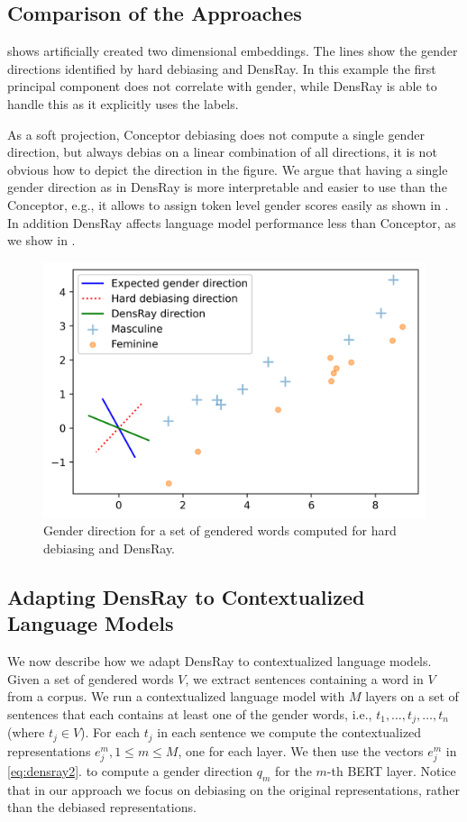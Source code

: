 \subsection{Comparison of the Approaches}
  shows artificially created two dimensional embeddings. The lines show the gender directions identified by hard debiasing and DensRay. In this example
 the first principal component does not correlate with gender, while DensRay is able to handle this as it explicitly uses the labels.
 
As a soft projection, Conceptor debiasing does not compute a single gender direction, but always debias on a linear combination of all directions, it is not obvious how to depict the direction in the figure. 
We argue that having a single gender direction as in DensRay is more interpretable and easier to use than the Conceptor, e.g., it allows to assign token level gender scores easily as shown in . In addition DensRay affects language model performance less than Conceptor, as we show in .
\begin{figure}[h]
	\centering
	\vspace{0cm}  
	\setlength{\abovecaptionskip}{0.0cm}   
	\setlength{\belowcaptionskip}{0cm}
	\includegraphics[width=0.4\linewidth]{examples.png}
	\caption{Gender direction for a set of gendered
          words computed for hard debiasing and DensRay.}
\end{figure}

\subsection{Adapting DensRay to Contextualized Language Models}
We now describe how we adapt DensRay to contextualized
language models. Given a set of gendered words
$V$, we extract sentences containing a word in $V$ from a
corpus. We run a contextualized language model
with $M$ layers
on a set of 
sentences that each contains at least one of the gender words, i.e., 
$t_1,\ldots,t_j,\ldots,t_n$ (where $t_j \in V$). 
For each $t_j $ in each sentence we  compute the contextualized representations $e_j^m, 1\leq m
\leq M$, one for each layer. We then use the vectors $e_j^m$ in \eqref{eq:densray2}.
to compute a gender direction
$q_m$ for the $m$-th BERT layer. 
Notice that in our approach we focus on debiasing on the original representations, rather than the debiased representations. 
